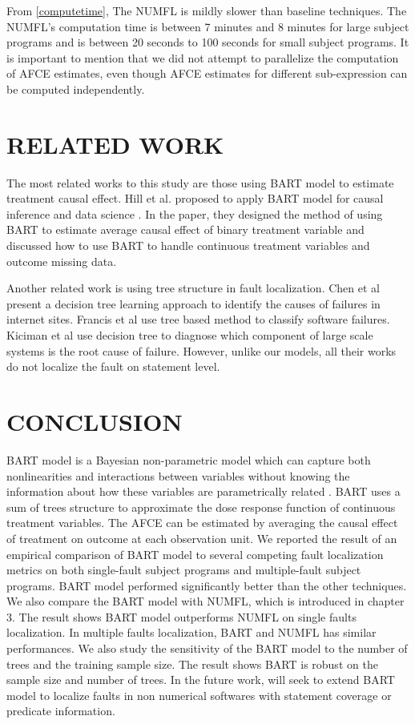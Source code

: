 From \ref{computetime}, The NUMFL is mildly slower than baseline techniques. The NUMFL's computation time is between 7 minutes and 8 minutes for large subject programs and is between  20 seconds to 100 seconds for small subject programs. It is important to mention that we did not attempt to parallelize the computation of AFCE estimates, even though AFCE estimates for different sub-expression can be computed independently.

\section{RELATED WORK}\label{BARTrelatedwork}
The most related works to this study are those using BART model to estimate treatment causal effect. Hill et al. proposed to apply BART model for causal inference and data science \cite{}. In the paper, they designed the method of using BART to estimate average causal effect of binary treatment variable and discussed how to use BART to handle continuous treatment variables and outcome missing data. 

Another related work is using tree structure in fault localization. Chen et al \cite{} present a decision tree learning approach to identify the causes of failures in internet sites. Francis et al \cite{} use tree based method to classify software failures. Kiciman et al \cite{} use decision tree to diagnose which component of large scale systems is the root cause of failure. However, unlike our models, all their works do not localize the fault on statement level.

\section{CONCLUSION}\label{BARTconclusion}
BART model is a Bayesian non-parametric model which can capture both nonlinearities and interactions between variables without knowing the information about how these variables are parametrically related . BART uses a sum of trees structure to approximate the dose response function of continuous treatment variables. The AFCE can be estimated by averaging the causal effect of treatment on outcome at each observation unit. We reported the result of an empirical comparison of BART model to several competing fault localization metrics on both single-fault subject programs and multiple-fault subject programs. BART model performed significantly better than the other techniques. We also compare the BART model with NUMFL, which is introduced in chapter 3. The result shows BART model outperforms NUMFL on single faults localization. In multiple faults localization, BART and NUMFL has similar performances.  We also study the sensitivity of the BART model to the number of trees and the training sample size. The result shows BART is robust on the sample size and number of trees.  In the future work, will seek to extend BART model to localize faults in non numerical softwares with statement coverage or predicate information. 